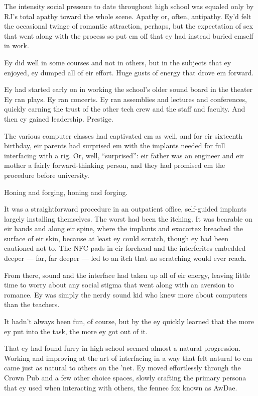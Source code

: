 The intensity social pressure to date throughout high school was equaled only by RJ's total apathy toward the whole scene. Apathy or, often, antipathy. Ey'd felt the occasional twinge of romantic attraction, perhaps, but the expectation of sex that went along with the process so put em off that ey had instead buried emself in work.

Ey did well in some courses and not in others, but in the subjects that ey enjoyed, ey dumped all of eir effort. Huge gusts of energy that drove em forward.

Ey had started early on in working the school's older sound board in the theater Ey ran plays. Ey ran concerts. Ey ran assemblies and lectures and conferences, quickly earning the trust of the other tech crew and the staff and faculty. And then ey gained leadership. Prestige.

The various computer classes had captivated em as well, and for eir sixteenth birthday, eir parents had surprised em with the implants needed for full interfacing with a rig. Or, well, ``surprised'': eir father was an engineer and eir mother a fairly forward-thinking person, and they had promised em the procedure before university.

Honing and forging, honing and forging.

It was a straightforward procedure in an outpatient office, self-guided implants largely installing themselves. The worst had been the itching. It was bearable on eir hands and along eir spine, where the implants and exocortex breached the surface of eir skin, because at least ey could scratch, though ey had been cautioned not to. The NFC pads in eir forehead and the interferites embedded deeper --- far, far deeper --- led to an itch that no scratching would ever reach.

From there, sound and the interface had taken up all of eir energy, leaving little time to worry about any social stigma that went along with an aversion to romance. Ey was simply the nerdy sound kid who knew more about computers than the teachers.

It hadn't always been fun, of course, but by the ey quickly learned that the more ey put into the task, the more ey got out of it.

That ey had found furry in high school seemed almost a natural progression. Working and improving at the art of interfacing in a way that felt natural to em came just as natural to others on the 'net. Ey moved effortlessly through the Crown Pub and a few other choice spaces, slowly crafting the primary persona that ey used when interacting with others, the fennec fox known as AwDae.

